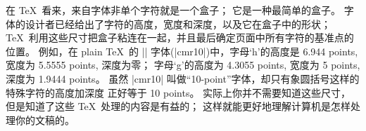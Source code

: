 \medskip\noindent
在 \TeX\ 看来，来自字体非单个字符就是一个盒子；
它是一种最简单的盒子。%
字体的设计者已经给出了字符的高度，宽度和深度，以及它在盒子中的形状；
\TeX\ 利用这些尺寸把盒子粘连在一起，并且最后确定页面中所有字符的基准点的位置。%
例如，在 plain \TeX\ 的 |\rm| 字体(|cmr10|)中，字母`h'的高度是 6.944 points,
宽度为 5.5555 points, 深度为零；
字母`g'的高度为 4.3055 points, 宽度为 5 points, 深度为 1.9444 points。%
虽然 |cmr10| 叫做``10-point''字体，却只有象圆括号这样的特殊字符的高度加深度%
正好等于 10 points。%
实际上你并不需要知道这些尺寸，但是知道了这些 \TeX\ 处理的内容是有益的；
这样就能更好地理解计算机是怎样处理你的文稿的。


